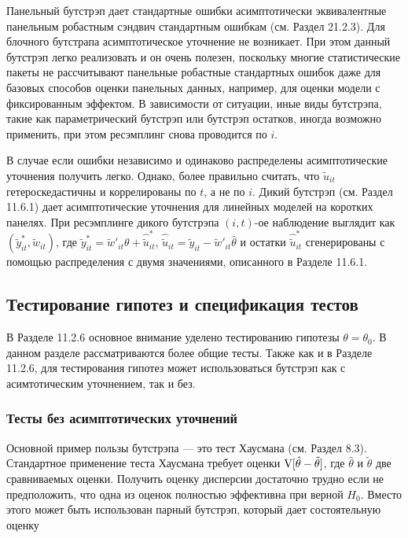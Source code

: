 Панельный бутстрэп дает стандартные ошибки асимптотически эквивалентные панельным робастным сэндвич стандартным ошибкам (см. Раздел 21.2.3). Для блочного бутстрапа асимптотическое уточнение не возникает. При этом данный бутстрэп легко реализовать и он очень полезен, поскольку многие статистические пакеты не рассчитывают панельные робастные стандартных ошибок даже для базовых способов оценки панельных данных, например, для оценки модели с фиксированным эффектом. В зависимости от ситуации, иные виды бутстрэпа, такие как параметрический бутстрэп или  бутстрэп остатков, иногда возможно применить, при этом ресэмплинг снова проводится по $i$.

В случае если ошибки независимо и одинаково распределены асимптотические уточнения получить легко. Однако, более правильно считать, что $\tilde{u}_{it}$ гетероскедастичны и коррелированы по $t$, а не по $i$. Дикий бутстрэп (см. Раздел 11.6.1) дает асимптотические уточнения  для линейных моделей на коротких панелях. При ресэмплинге дикого бутстрэпа $(i,t)$-ое наблюдение выглядит как $(\tilde{y}^{*}_{it},\tilde{w}_{it})$, где $\tilde{y}^{*}_{it}=\tilde{w}'_{it}\theta+\hat{\tilde{u}}_{it}^*$, $\hat{\tilde{u}}_{it}=\tilde{y}_{it}-\tilde{w}'_{it}\hat{\theta}$ и остатки $\hat{\tilde{u}}_{it}^*$ сгенерированы с помощью распределения с двумя значениями, описанного в Разделе 11.6.1.

\subsection{Тестирование гипотез и спецификация тестов}

В Разделе 11.2.6 основное внимание уделено тестированию гипотезы $\theta=\theta_0$. В данном разделе рассматриваются более общие тесты. Также как и в Разделе 11.2.6, для тестирования гипотез может использоваться бутстрэп как с асимтотическим уточнением, так и без. 


\subsubsection*{Тесты без асимптотических уточнений}

Основной пример пользы бутстрэпа --- это  тест Хаусмана (см. Раздел 8.3). Стандартное применение теста Хаусмана требует оценки $\mathrm{V}[\hat{\theta}-\tilde{\theta}]$, где $\hat{\theta}$ и $\tilde{\theta}$ две сравниваемых оценки. Получить  оценку дисперсии достаточно трудно если не предположить, что одна из оценок полностью эффективна при верной  $H_0$. Вместо этого может быть использован парный бутстрэп, который дает состоятельную оценку

